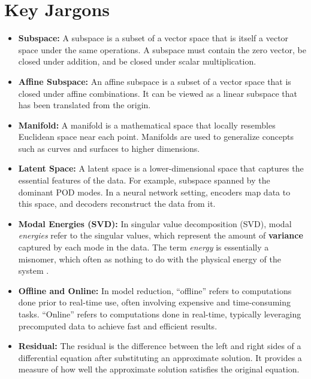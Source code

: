 \documentclass[11pt]{article}
\begin{document}
            \section{Key Jargons}
            \label{sec:glossary}



            \begin{itemize}
                    \item \textbf{Subspace:} A subspace is a subset of a vector space that is itself a vector space under the same operations. A subspace must contain the zero vector, be closed under addition, and be closed under scalar multiplication.

                    \item \textbf{Affine Subspace:} An affine subspace is a subset of a vector space that is closed under affine combinations. It can be viewed as a linear subspace that has been translated from the origin.

                    \item \textbf{Manifold:} A manifold is a mathematical space that locally resembles Euclidean space near each point. Manifolds are used to generalize concepts such as curves and surfaces to higher dimensions.

                    \item \textbf{Latent Space:} A latent space is a lower-dimensional space that captures the essential features of the data. For example, subspace spanned by the dominant POD modes. In a neural network setting, encoders map data to this space, and decoders reconstruct the data from it.

                    \item \textbf{Modal Energies (SVD):} In singular value decomposition (SVD), modal \textit{energies} refer to the singular values, which represent the amount of \textbf{variance} captured by each mode in the data. The term \textit{energy} is essentially a misnomer, which often as nothing to do with the physical energy of the system \cite{bhattacharyya2020energy}.

                    \item \textbf{Offline and Online:} In model reduction, ``offline'' refers to computations done prior to real-time use, often involving expensive and time-consuming tasks. ``Online'' refers to computations done in real-time, typically leveraging precomputed data to achieve fast and efficient results.

                    \item \textbf{Residual:} The residual is the difference between the left and right sides of a differential equation after substituting an approximate solution. It provides a measure of how well the approximate solution satisfies the original equation.


\end{itemize}
\end{document}
